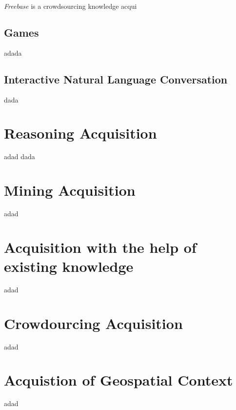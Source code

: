 \emph{Freebase} is a crowdsourcing knowledge acqui

\subsection{Games}
adada


\subsection{Interactive Natural Language Conversation}
dada

\section{Reasoning Acquisition}
adad dada

\section{Mining Acquisition}
\label{section:MiningAcquisition}
adad

\section{Acquisition with the help of existing knowledge}
adad

\section{Crowdourcing Acquisition}
adad

\section{Acquistion of Geospatial Context}
adad
